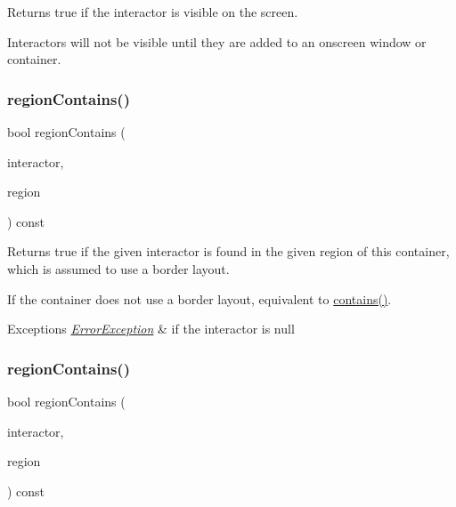 Returns true if the interactor is visible on the screen. 

Interactors will not be visible until they are added to an onscreen window or container. \mbox{\label{classGContainer_a8909db9abf4dc80058f9e4a7b90ea2d0}} 
\subsubsection{\texorpdfstring{region\+Contains()}{regionContains()}\hspace{0.1cm}{\footnotesize\ttfamily [1/4]}}
{\footnotesize\ttfamily bool region\+Contains (\begin{DoxyParamCaption}\item[{\mbox{\hyperlink{classGInteractor}{G\+Interactor}} $\ast$}]{interactor,  }\item[{\mbox{\hyperlink{classGContainer_a81a01a86de31071a92e6cce0bab9bc4b}{G\+Container\+::\+Region}}}]{region }\end{DoxyParamCaption}) const\hspace{0.3cm}{\ttfamily [virtual]}}



Returns true if the given interactor is found in the given region of this container, which is assumed to use a border layout. 

If the container does not use a border layout, equivalent to \mbox{\hyperlink{classGContainer_a29e67f98cd36414c67475b8941d861a6}{contains()}}. 
\begin{DoxyExceptions}{Exceptions}
{\em \mbox{\hyperlink{classErrorException}{Error\+Exception}}} & if the interactor is null \\
\hline
\end{DoxyExceptions}
\mbox{\label{classGContainer_a84a56bae6b8883d27e44d51c31b2bfc5}} 
\subsubsection{\texorpdfstring{region\+Contains()}{regionContains()}\hspace{0.1cm}{\footnotesize\ttfamily [2/4]}}
{\footnotesize\ttfamily bool region\+Contains (\begin{DoxyParamCaption}\item[{\mbox{\hyperlink{classGInteractor}{G\+Interactor}} $\ast$}]{interactor,  }\item[{const std\+::string \&}]{region }\end{DoxyParamCaption}) const\hspace{0.3cm}{\ttfamily [virtual]}}



